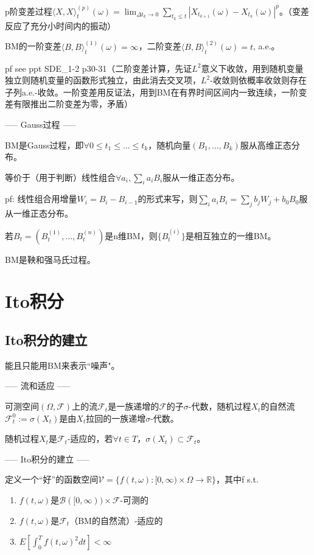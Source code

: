 p阶变差过程$\langle X, X \rangle_{t}^{(p)}(\omega)=\lim_{\Delta t_{k} \rightarrow 0} \sum_{t_{k} \leqslant t}|X_{t_{k+1}}(\omega)-X_{t_{k}}(\omega)|^{p}$。（变差反应了充分小时间内的振动）

BM的一阶变差$\langle B, B \rangle_{t}^{(1)}(\omega) = \infty$，二阶变差$\langle B, B \rangle_{t}^{(2)}(\omega) = t$, a.e.。

pf see ppt SDE\_1-2 p30-31（二阶变差计算，先证$L^2$意义下收敛，用到随机变量独立则随机变量的函数形式独立，由此消去交叉项，$L^2$-收敛则依概率收敛则存在子列a.e.-收敛。一阶变差用反证法，用到BM在有界时间区间内一致连续，一阶变差有限推出二阶变差为零，矛盾）

----- Gauss过程 -----

BM是Gauss过程，即$\forall 0 \le t_1 \le \dots \le t_k$，随机向量$(B_1, \dots, B_k)$服从高维正态分布。

等价于（用于判断）线性组合$\forall a_i, \sum_i a_i B_i$服从一维正态分布。

pf: 线性组合用增量$W_i = B_i - B_{i - 1}$的形式来写，则$\sum_i a_i B_i = \sum_j b_j W_j + b_0 B_0$服从一维正态分布。

若$B_t = (B_t^{(1)}, \dots, B_t^{(n)})$是n维BM，则$\{B_t^{(i)}\}$是相互独立的一维BM。

BM是鞅和强马氏过程。

\section{Ito积分}

\subsection{Ito积分的建立}

能且只能用BM来表示“噪声"。

----- 流和适应 -----

可测空间$(\Omega, \mathcal{F})$上的流$\mathcal{F}_t$是一族递增的$\mathcal{F}$的子$\sigma$-代数，随机过程$X_t$的自然流$\mathcal{F}_t^0 := \sigma(X_t)$是由$X_t$拉回的一族递增$\sigma$-代数。

随机过程$X_t$是$\mathcal{F}_t$-适应的，若$\forall t \in T$，$\sigma(X_t) \subset \mathcal{F}_t$。
 
----- Ito积分的建立 -----

定义一个“好”的函数空间$\mathcal{V} = \{ f(t, \omega):[0, \infty) \times \Omega \to \mathbb{R} \}$，其中f s.t.
\begin{enumerate}
  \item $f(t, \omega)$是$\mathcal{B}([0, \infty)) \times \mathcal{F}$-可测的
  \item $f(t, \omega)$是$\mathcal{F}_{t}$（BM的自然流）-适应的
  \item $E\left[\int_{0}^{T} f(t, \omega)^{2} d t\right]<\infty$
\end{enumerate}

